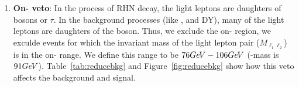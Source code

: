 \documentclass[letterpaper,12pt]{article}
\newcommand{\GeV}{{Ge\kern -0.1em V}}
\begin{document}
\begin{enumerate}
  \item \textbf{On-\boldmath{\Zboson} veto}: In the process of RHN decay, the light leptons are daughters of \Wboson{} bosons or $\tau$. In the background processes (like \ZZ, \WZ{} and DY), many of the light leptons are daughters of the \Zboson{} boson. Thus, we exclude the on-\Zboson{} region, \ie{} we exculde events for which the invariant mass of the light lepton pair ($M_{\ell_{1}\ell_{2}}$) is in the on-\Zboson{} range. We define this range to be $76\GeV - 106\GeV$ (\Zboson-mass is $91\GeV$). Table~\ref{tab:reducebkg} and Figure~\ref{fig:reducebkg} show how this veto affects the background and signal.

\begin{table}[h]
  \centering
  \footnotesize
  \setlength{\tabcolsep}{20pt}
  \renewcommand{\arraystretch}{1.6}
  \caption[Effect of on-\Zboson{} veto]{The number of events before and after applying the On-\Zboson{} veto. The signal also reduces with the background but the overall significance improves in every region.}
  \label{tab:reducebkg}
\end{table}


\end{enumerate}
\end{document}
